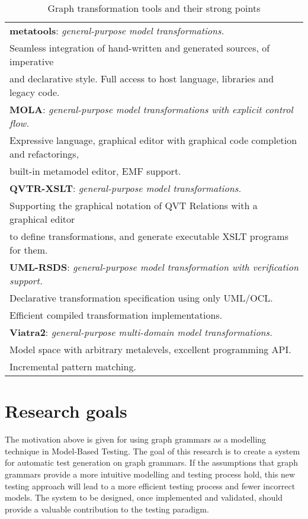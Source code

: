 \begin{table}[ht]
\begin{center}
\begin{tabular}{l}
\textbf{metatools}: \textit{general-purpose model transformations.} \\
Seamless integration of hand-written and generated sources, of imperative \\
and declarative style. Full access to host language, libraries and legacy code.  \\ \hline

\textbf{MOLA}: \textit{general-purpose model transformations with explicit control flow.}\\
Expressive language, graphical editor with graphical code completion and refactorings, \\
built-in metamodel editor, EMF support.  \\ \hline

\textbf{QVTR-XSLT}: \textit{general-purpose model transformations.} \\
Supporting the graphical notation of QVT Relations with a graphical editor \\
to define transformations, and generate executable XSLT programs for them.  \\ \hline

\textbf{UML-RSDS}: \textit{general-purpose model transformation with verification support.} \\
Declarative transformation specification using only UML/OCL. \\
Efficient compiled transformation implementations.  \\ \hline

\textbf{Viatra2}: \textit{general-purpose multi-domain model transformations.} \\
Model space with arbitrary metalevels, excellent programming API. \\
Incremental pattern matching.  \\ \hline
\end{tabular}
\end{center}
\caption{Graph transformation tools and their strong points}
\label{tab:gg_tools}
\end{table}

\section{Research goals}\label{sec:goals}
The motivation above is given for using graph grammars as a modelling technique in Model-Based Testing. The goal of this research is to create a system for automatic test generation on graph grammars. If the assumptions that graph grammars provide a more intuitive modelling and testing process hold, this new testing approach will lead to a more efficient testing process and fewer incorrect models. The system to be designed, once implemented and validated, should provide a valuable contribution to the testing paradigm. 

